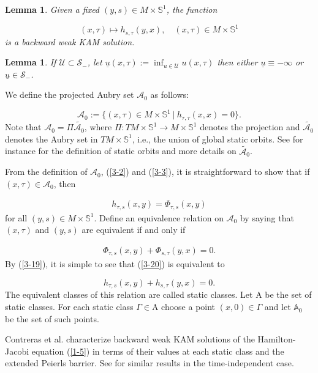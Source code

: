 \documentclass{amsart}[12pt]
\newtheorem{lemma}[theorem]{Lemma}
\theoremstyle{definition}
\theoremstyle{remark}
\numberwithin{equation}{section}
\begin{document}
\begin{lemma}\label{le3-2}
Given a fixed $(y,s)\in M\times\mathbb{S}^1$, the function

\[
(x,\tau)\mapsto h_{s,\tau}(y,x),\quad (x,\tau)\in
M\times\mathbb{S}^1
\]
is a  backward weak KAM solution.
\end{lemma}

\begin{lemma}\label{le3-3}
If $\mathcal{U}\subset \mathcal{S}_-$, let
$\underline{u}(x,\tau):=\inf_{u\in\mathcal{U}}u(x,\tau)$ then
either $\underline{u}\equiv-\infty$ or
$\underline{u}\in\mathcal{S}_-$.
\end{lemma}

We define the projected Aubry set $\mathcal{A}_0$ as follows:

\[
\mathcal{A}_0:=\{(x,\tau)\in M\times\mathbb{S}^1\ |\
h_{\tau,\tau}(x,x)=0\}.
\]
Note that $\mathcal{A}_0=\Pi\tilde{\mathcal{A}_0}$, where
$\Pi:TM\times\mathbb{S}^1\to M\times\mathbb{S}^1$ denotes the
projection and $\tilde{\mathcal{A}_0}$ denotes the Aubry set in
$TM\times\mathbb{S}^1$, i.e., the union of global static orbits.
See for instance \cite{Ber} for the definition of static orbits
and more details on $\tilde{\mathcal{A}_0}$.

From the definition of $\mathcal{A}_0$, (\ref{3-2}) and
(\ref{3-3}), it is straightforward to show that if
$(x,\tau)\in\mathcal{A}_0$, then

\begin{align}\label{3-19}
h_{\tau,s}(x,y)=\Phi_{\tau,s}(x,y)
\end{align}
for all $(y,s)\in M\times\mathbb{S}^1$. Define an equivalence
relation on $\mathcal{A}_0$ by saying that $(x,\tau)$ and $(y,s)$
are equivalent if and only if

\begin{align}\label{3-20}
\Phi_{\tau,s}(x,y)+\Phi_{s,\tau}(y,x)=0.
\end{align}
By (\ref{3-19}), it is simple to see that (\ref{3-20}) is
equivalent to

\[
h_{\tau,s}(x,y)+h_{s,\tau}(y,x)=0.
\]
The equivalent classes of this relation are called static classes.
Let $\mathrm A$ be the set of static classes. For each static
class $\Gamma\in \mathrm A$ choose a point $(x,0)\in\Gamma$ and
let $\mathbb{A}_0$ be the set of such points.

Contreras et al. \cite{Con} characterize  backward weak KAM
solutions of the Hamilton-Jacobi equation (\ref{1-5}) in terms of
their values at each static class and the extended Peierls
barrier. See \cite{Con01} for similar results in the
time-independent case.
\end{document}
